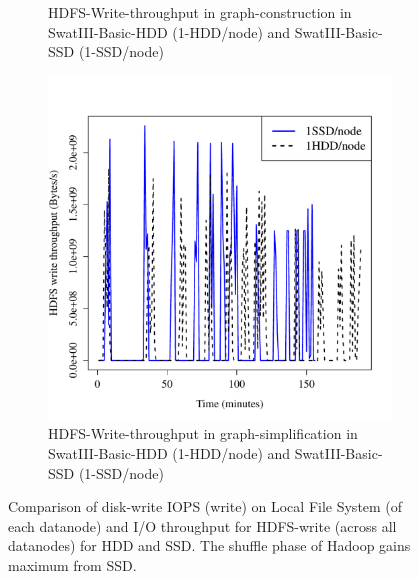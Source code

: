 \documentclass[conference]{IEEEtran}
\begin{document}
\begin{figure}[htb]
\begin{subfigure}[b]{0.23\textwidth}
                \caption{HDFS-Write-throughput in graph-construction in SwatIII-Basic-HDD (1-HDD/node) and SwatIII-Basic-SSD (1-SSD/node)}
                \label{fig:BGHddSsdHdfsWrIops}
        \end{subfigure}
        \begin{subfigure}[b]{0.23\textwidth}
                \includegraphics[width=\textwidth]{Figure/SystemData/Plots/ECHddSsdHdfsWrIops.pdf}
                \caption{HDFS-Write-throughput in graph-simplification in SwatIII-Basic-HDD (1-HDD/node) and SwatIII-Basic-SSD (1-SSD/node)}
                \label{fig:ECHddSsdHdfsWrIops}
        \end{subfigure}       
        \caption{Comparison of disk-write IOPS (write) on Local File System (of each datanode) and I/O throughput for HDFS-write (across all datanodes) for HDD and SSD. The shuffle phase of Hadoop gains maximum from SSD.}\label{fig:HddSsdHdfsRWps}   
        \vspace{-1.5em}
\end{figure}
\end{document}
